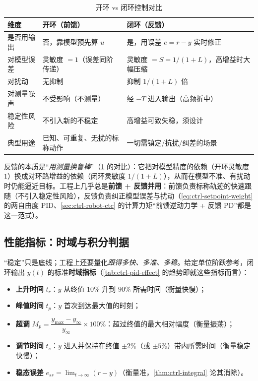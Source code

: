 \begin{table}[H]\centering\small
\caption{开环 vs 闭环控制对比}
\label{tab:ctrl-open-closed}
\begin{tabular}{p{} p{} p{}}
\toprule
维度 & 开环（前馈） & 闭环（反馈） \\
\midrule
是否用输出 & 否，靠模型预先算 $u$ & 是，用误差 $e=r-y$ 实时修正 \\
对模型误差 & 灵敏度 $=1$（误差同阶传递） & 灵敏度 $=S=1/(1+L)$，高增益时大幅压缩 \\
对扰动 & 无抑制 & 抑制 $1/(1+L)$ 倍 \\
对测量噪声 & 不受影响（不测量） & 经 $-T$ 进入输出（高频折中） \\
稳定性风险 & 不引入新的不稳定 & 高增益可致失稳，须设计 \\
典型用途 & 已知、可重复、无扰的标称动作 & 一切需镇定/抗扰/纠差的场景 \\
\bottomrule
\end{tabular}
\end{table}

\begin{insight}
反馈的本质是“\emph{用测量换鲁棒}”（\cref{tab:ctrl-open-closed} 的对比）：它把对模型精度的依赖（开环灵敏度 $1$）换成对环路增益的依赖（闭环灵敏度 $1/(1+L)$），从而在模型不准、有扰动时仍能逼近目标。工程上几乎总是\textbf{前馈 + 反馈并用}：前馈负责标称轨迹的快速跟随（不引入稳定性风险），反馈负责纠正模型误差与扰动（\cref{eq:ctrl-setpoint-weight} 的两自由度 PID、\cref{sec:ctrl-robot-ctc} 的计算力矩“前馈逆动力学 + 反馈 PD”都是这一范式）。
\end{insight}

\subsection{性能指标：时域与积分判据}
\label{sec:ctrl-performance}

“稳定”只是底线；工程上还要量化\emph{跟得多快、多准、多稳}。给定单位阶跃参考，闭环输出 $y(t)$ 的标准\textbf{时域指标}\cite{astrom2008feedback}（\cref{tab:ctrl-pid-effect} 的趋势即就这些指标而言）：

\begin{itemize}
  \item \textbf{上升时间} $t_r$：$y$ 从终值 $10\%$ 升到 $90\%$ 所需时间（衡量快慢）；
  \item \textbf{峰值时间} $t_p$：$y$ 首次到达最大值的时刻；
  \item \textbf{超调} $M_p=\dfrac{y_{\max}-y_\infty}{y_\infty}\times100\%$：超过终值的最大相对幅度（衡量振荡）；
  \item \textbf{调节时间} $t_s$：$y$ 进入并保持在终值 $\pm2\%$（或 $\pm5\%$）带内所需时间（衡量稳定快慢）；
  \item \textbf{稳态误差} $e_{ss}=\lim_{t\to\infty}(r-y)$（衡量准，\cref{thm:ctrl-integral} 论其消除）。
\end{itemize}

